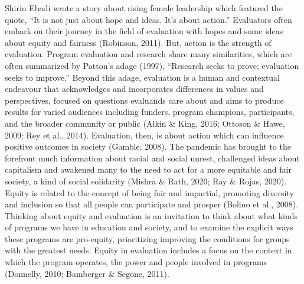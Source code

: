 \documentclass[
]{book}
\begin{document}
Shirin Ebadi wrote a story about rising female leadership which featured the quote, ``It is not just about hope and ideas. It's about action.'' Evaluators often embark on their journey in the field of evaluation with hopes and some ideas about equity and fairness (Robinson, 2011). But, action is the strength of evaluation. Program evaluation and research share many similarities, which are often summarized by Patton's adage (1997), ``Research seeks to prove; evaluation seeks to improve.'' Beyond this adage, evaluation is a human and contextual endeavour that acknowledges and incorporates differences in values and perspectives, focused on questions evaluands care about and aims to produce results for varied audiences including funders, program champions, participants, and the broader community or public (Alkin \& King, 2016; Ottoson \& Hawe, 2009; Rey et al., 2014). Evaluation, then, is about action which can influence positive outcomes in society (Gamble, 2008). The pandemic has brought to the forefront much information about racial and social unrest, challenged ideas about capitalism and awakened many to the need to act for a more equitable and fair society, a kind of social solidarity (Mishra \& Rath, 2020; Ray \& Rojas, 2020). Equity is related to the concept of being fair and impartial, promoting diversity and inclusion so that all people can participate and prosper (Bolino et al., 2008). Thinking about equity and evaluation is an invitation to think about what kinds of programs we have in education and society, and to examine the explicit ways these programs are pro-equity, prioritizing improving the conditions for groups with the greatest needs. Equity in evaluation includes a focus on the context in which the program operates, the power and people involved in programs (Donnelly, 2010; Bamberger \& Segone, 2011).
\end{document}
